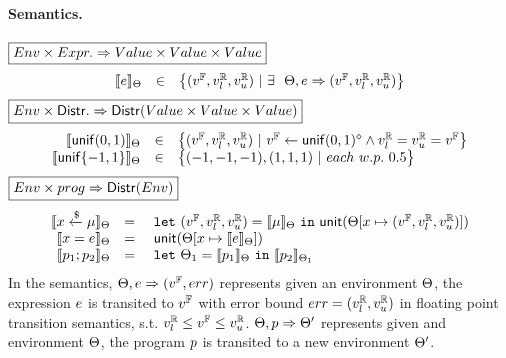\documentclass[a4paper,11pt]{article}
\begin{document}
\paragraph{Semantics.}
$\boxed{Env \times Expr. \Rightarrow Value \times Value \times Value }$
%
\[
	\begin{array}{rcl}
	\llbracket e \rrbracket_{\Theta}
	& \in &  
	\big\{(v^{\mathbb{F}}, v^{\mathbb{R}}_{l}, v^{\mathbb{R}}_{u}) ~|~
	\exists ~~  
	\Theta,  
	e \Rightarrow (v^{\mathbb{F}}, v^{\mathbb{R}}_{l}, v^{\mathbb{R}}_{u})\big\}
	\end{array}
\]
%
$
\boxed{Env \times \mathsf{Distr}. \Rightarrow 
\mathsf{Distr}(Value \times Value \times Value )}
$
%
\[
	\begin{array}{rcl}
	\llbracket \mathsf{unif}(0, 1) \rrbracket_{\Theta}
	& \in & 
	\big\{
	(v^{\mathbb{F}}, v^{\mathbb{R}}_{l}, v^{\mathbb{R}}_{u}) ~|~
	v^{\mathbb{F}} \leftarrow \mathsf{unif}(0, 1)^{\diamond}
	\land v^{\mathbb{R}}_{l} = v^{\mathbb{R}}_{u} = v^{\mathbb{F}}
	\big\}\\
	\llbracket \mathsf{unif}\{-1, 1\} \rrbracket_{\Theta}
	& \in & 
	\big\{
	(-1, -1, -1), (1, 1, 1) ~|~
	each ~ w.p. ~ 0.5 
	\big\}\\	
	\end{array}
\]
%
$\boxed{Env \times prog \Rightarrow \mathsf{Distr}(Env)}$
\[
\begin{array}{rcl}
	\llbracket x \xleftarrow{\$} \mu \rrbracket_{\Theta}
	& = & 
	~\mathtt{let}~ (v^{\mathbb{F}}, v^{\mathbb{R}}_{l}, v^{\mathbb{R}}_{u}) = \llbracket \mu \rrbracket_{\Theta}
	~\mathtt{in}~ 
	\mathsf{unit}(\Theta[x \mapsto (v^{\mathbb{F}}, v^{\mathbb{R}}_{l}, v^{\mathbb{R}}_{u})])
	\\
	\llbracket x = e \rrbracket_{\Theta}
	& = &  
	~\mathsf{unit}(\Theta[x \mapsto \llbracket e \rrbracket_{\Theta}])
	\\
	\llbracket p_1; p_2 \rrbracket_{\Theta}
	& = &  ~\mathtt{let}~  \Theta_1 = 
	\llbracket p_1 \rrbracket_{\Theta} ~\mathtt{in}~
	\llbracket p_2 \rrbracket_{\Theta_1} 
\end{array}
\]
%
In the semantics, 
%
$\Theta, e \Rightarrow (v^{\mathbb{F}}, err)$ represents given an environment
%
$\Theta$, the expression $e$
%
is transited to $v^{\mathbb{F}}$ with error bound $err = (v^{\mathbb{R}}_{l}, v^{\mathbb{R}}_{u})$
in floating point transition semantics,
%
s.t. $v^{\mathbb{R}}_{l} \leq v^{\mathbb{F}} \leq v^{\mathbb{R}}_{u}$.
%
$\Theta, p \Rightarrow \Theta'$ represents given and environment $\Theta$,
%
the program $p$ is transited to a new environment $\Theta'$.
%
%
%
\end{document}
